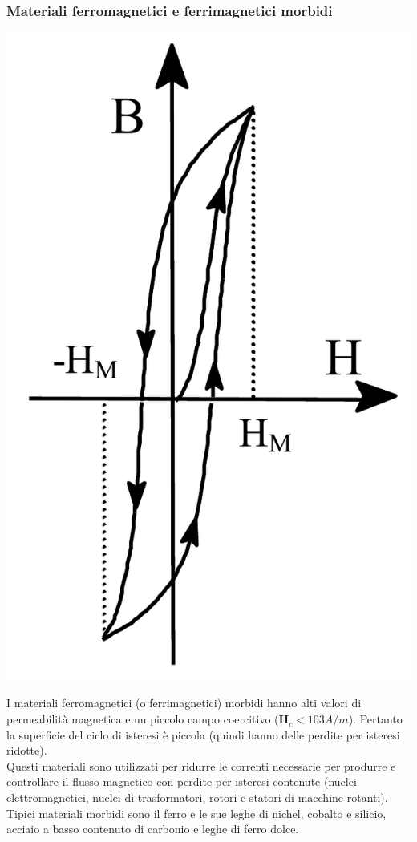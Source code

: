 \documentclass{article}
\begin{document}
\subsubsection{Materiali ferromagnetici e ferrimagnetici morbidi}
\begin{center}
    \includegraphics[scale=0.2]{Image/Isteresi_magnetica_3.png}
\end{center}
I materiali ferromagnetici (o ferrimagnetici)
morbidi hanno alti valori di permeabilità magnetica e un piccolo campo coercitivo ($\mathbf{H}_c < 103 A/m$). Pertanto la superficie del ciclo di isteresi è piccola (quindi hanno delle perdite per isteresi ridotte).\\
Questi materiali sono utilizzati per ridurre le correnti necessarie per produrre e controllare il flusso magnetico con perdite per isteresi contenute (nuclei elettromagnetici, nuclei di trasformatori, rotori e statori di macchine rotanti).\\
Tipici materiali morbidi sono il ferro e le sue leghe di nichel, cobalto e silicio, acciaio a basso contenuto di carbonio e leghe di ferro dolce.
\end{document}
